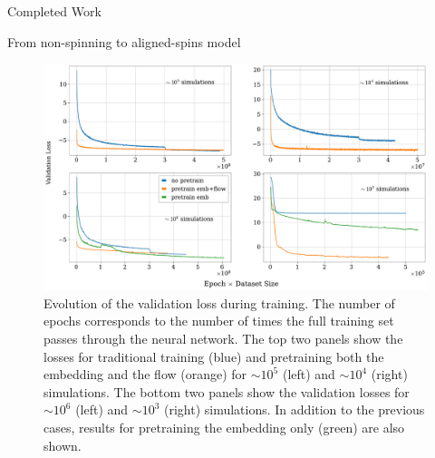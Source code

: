 \documentclass[11pt,a4paper,oneside]{book}
\numberwithin{equation}{chapter}
\numberwithin{table}{chapter}
\numberwithin{figure}{chapter}
\begin{document}
\begin{chapter}{Completed Work}
\begin{section}{From non-spinning to aligned-spins model}
\begin{figure}
\includegraphics[width=1.\columnwidth]{figures/val_loss.pdf}
\caption{Evolution of the validation loss during training. The number of epochs corresponds to the number of times the full training set passes through the neural network. The top two panels show the losses for traditional training (blue) and pretraining both the embedding and the flow (orange) for $\sim10^{5}$ (left) and $\sim10^{4}$ (right) simulations. The bottom two panels show the validation losses for  $\sim10^{6}$ (left) and $\sim10^{3}$ (right) simulations. In addition to the previous cases, results for pretraining the embedding only (green) are also shown.}
\label{loss}
\end{figure}


\end{section}
\end{chapter}
\end{document}
